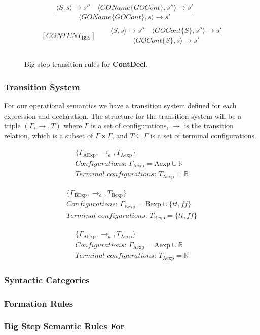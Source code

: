 \begin{figure}[htbp]
	\centering
	\begin{gather*}
		[GAMEOBJECT_\text{BSS}] 
		\qquad \dfrac
		{\langle S, s\rangle \rightarrow s'' \quad\langle GOName \{GOCont\}, s''\rangle \rightarrow s'}
		{\langle GOName \{GOCont\}, s\rangle\rightarrow s'}
		\\
		\\
		[CONTENT_\text{BSS}] 
		\qquad \dfrac
		{\langle S, s\rangle \rightarrow s'' \quad\langle GOCont \{S\}, s''\rangle \rightarrow s'}
		{\langle GOCont \{S\}, s\rangle\rightarrow s'}
		\\
		\\
	\end{gather*}
	\caption{Big-step transition rules for \textbf{ContDecl}.}
	\label{fig:BssStm}
\end{figure}


\subsubsection*{Transition System}

For our operational semantics we have a transition system defined for each expression and declaration. 
The structure for the transition system will be a triple $(\Gamma,\rightarrow,T)$ where $\Gamma$ is a set of configurations, $\rightarrow$ is the transition relation, which is a subset of $\Gamma\times\Gamma$, and $T\subseteq \Gamma$ is a set of terminal configurations. \cite{huttelTransitionsTreesIntroduction2010}


\begin{gather*} 
	\{ \Gamma_\text{AExp}, \rightarrow_a, T_\text{Aexp} \} \\ 
	\textit{Configurations: } \Gamma_\text{Aexp} = \text{Aexp} \cup \mathbb{R} \\ 
	\textit{Terminal configurations: } T_\text{Aexp} = \mathbb{R}
\end{gather*} 

\begin{gather*} 
	\{ \Gamma_\text{BExp}, \rightarrow_a, T_\text{Bexp} \} \\ 
	\textit{Configurations: } \Gamma_\text{Bexp} = \text{Bexp} \cup \{tt, f\!f\} \\ 
	\textit{Terminal configurations: } T_\text{Bexp} = \{tt, f\!f\}
\end{gather*}

\begin{gather*} 
	\{ \Gamma_\text{AExp}, \rightarrow_a, T_\text{Aexp} \} \\ 
	\textit{Configurations: } \Gamma_\text{Aexp} = \text{Aexp} \cup \mathbb{R} \\ 
	\textit{Terminal configurations: } T_\text{Aexp} = \mathbb{R}
\end{gather*} 

\subsubsection*{Syntactic Categories}
\subsubsection*{Formation Rules}
\subsubsection*{Big Step Semantic Rules For \dazel{}}